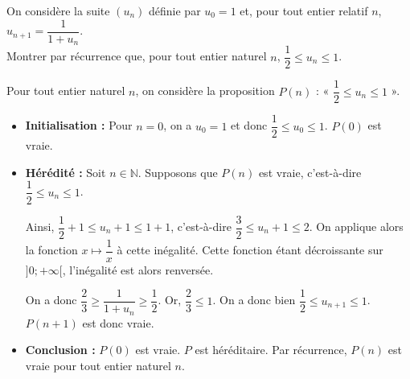 \documentclass[11pt,fleqn]{book} %
\begin{document}
\begin{exercise}[topic=rec02]On considère la suite $(u_n)$ définie par $u_0=1$ et, pour tout entier relatif $n$, $u_{n+1}=\dfrac{1}{1+u_n}$.\\ Montrer par récurrence que, pour tout entier naturel $n$, $\dfrac{1}{2} \leqslant u_n \leqslant 1$.
\end{exercise}
\begin{solution}Pour tout entier naturel $n$, on considère la proposition $P(n)$ : « $\dfrac{1}{2} \leqslant u_n \leqslant 1$ ».
\begin{itemize}
\item \textbf{Initialisation :} Pour $n=0$, on a $u_0=1$ et donc $\dfrac{1}{2}\leqslant u_0\leqslant 1$. $P(0)$ est vraie.
\item \textbf{Hérédité :} Soit $n\in\mathbb{N}$. Supposons que $P(n)$ est vraie, c'est-à-dire $\dfrac{1}{2} \leqslant u_n \leqslant 1$. 

Ainsi, $\dfrac{1}{2}+1 \leqslant u_n+1 \leqslant 1+1$, c'est-à-dire $\dfrac{3}{2} \leqslant u_n+1 \leqslant 2$. On applique alors la fonction $x\mapsto \dfrac{1}{x}$ à cette inégalité. Cette fonction étant décroissante sur $]0;+\infty[$, l'inégalité est alors renversée. 

On a donc $\dfrac{2}{3} \geqslant \dfrac{1}{1+u_n} \geqslant \dfrac{1}{2}$. Or, $\dfrac{2}{3} \leqslant 1$. On a donc bien $\dfrac{1}{2} \leqslant u_{n+1} \leqslant 1$. $P(n+1)$ est donc vraie.
\item \textbf{Conclusion :} $P(0)$ est vraie. $P$ est héréditaire. Par récurrence, $P(n)$ est vraie pour tout entier naturel $n$.
\end{itemize}\end{solution}
\end{document}
